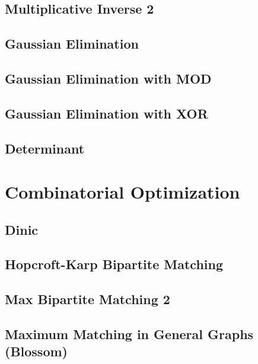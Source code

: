 \subsection{Multiplicative Inverse 2}
\raggedbottom
\hrulefill
\subsection{Gaussian Elimination}
\raggedbottom
\hrulefill
\subsection{Gaussian Elimination with MOD}
\raggedbottom
\hrulefill
\subsection{Gaussian Elimination with XOR}
\raggedbottom
\hrulefill
\subsection{Determinant}
\raggedbottom
\hrulefill

\section{Combinatorial Optimization}
\subsection{Dinic}
\raggedbottom
\hrulefill
\subsection{Hopcroft-Karp Bipartite Matching}
\raggedbottom
\hrulefill
\subsection{Max Bipartite Matching 2}
\raggedbottom
\hrulefill
\subsection{Maximum Matching in General Graphs (Blossom)}
\raggedbottom
\hrulefill
